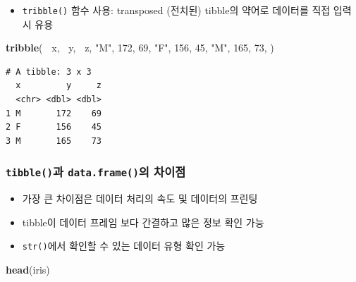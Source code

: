 \documentclass[
  11pt,
]{krantz}
\newenvironment{Shaded}{\begin{snugshade}}{\end{snugshade}}
\newcommand{\DecValTok}[1]{\textcolor[rgb]{0.06,0.06,0.06}{#1}}
\newcommand{\KeywordTok}[1]{\textcolor[rgb]{0.27,0.27,0.27}{\textbf{#1}}}
\newcommand{\NormalTok}[1]{#1}
\newcommand{\OperatorTok}[1]{\textcolor[rgb]{0.43,0.43,0.43}{\textbf{#1}}}
\newcommand{\StringTok}[1]{\textcolor[rgb]{0.5,0.5,0.5}{#1}}
\providecommand{\tightlist}{%
  \setlength{\itemsep}{0pt}\setlength{\parskip}{0pt}}
\begin{document}
\normalsize

\begin{itemize}
\tightlist
\item
  \texttt{tribble()} 함수 사용: transposed (전치된) tibble의 약어로 데이터를 직접 입력 시 유용
\end{itemize}

\footnotesize

\begin{Shaded}
\begin{Highlighting}[]
\KeywordTok{tribble}\NormalTok{(}
   \OperatorTok{~}\NormalTok{x, }\OperatorTok{~}\NormalTok{y,   }\OperatorTok{~}\NormalTok{z,}
  \StringTok{"M"}\NormalTok{, }\DecValTok{172}\NormalTok{,  }\DecValTok{69}\NormalTok{,}
  \StringTok{"F"}\NormalTok{, }\DecValTok{156}\NormalTok{,  }\DecValTok{45}\NormalTok{, }
  \StringTok{"M"}\NormalTok{, }\DecValTok{165}\NormalTok{,  }\DecValTok{73}\NormalTok{, }
\NormalTok{)}
\end{Highlighting}
\end{Shaded}

\begin{verbatim}
# A tibble: 3 x 3
  x         y     z
  <chr> <dbl> <dbl>
1 M       172    69
2 F       156    45
3 M       165    73
\end{verbatim}

\normalsize

\hypertarget{diff-tibble-df}{%
\subsubsection*{\texorpdfstring{\texttt{tibble()}과 \texttt{data.frame()}의 차이점}{tibble()과 data.frame()의 차이점}}\label{diff-tibble-df}}


\begin{itemize}
\tightlist
\item
  가장 큰 차이점은 데이터 처리의 속도 및 데이터의 프린팅
\item
  tibble이 데이터 프레임 보다 간결하고 많은 정보 확인 가능
\item
  \texttt{str()}에서 확인할 수 있는 데이터 유형 확인 가능
\end{itemize}

\footnotesize

\begin{Shaded}
\begin{Highlighting}[]
\KeywordTok{head}\NormalTok{(iris)}
\end{Highlighting}
\end{Shaded}
\end{document}
